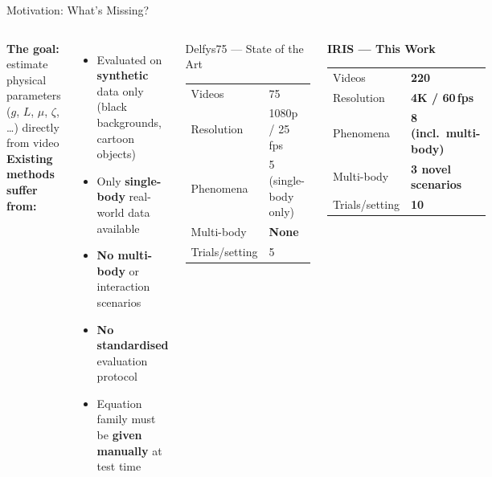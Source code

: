 \documentclass[aspectratio=169,12pt]{beamer}
\newcommand{\highlight}[1]{\textcolor{irisblue}{\textbf{#1}}}
\newcommand{\bad}[1]{\textcolor{irisred}{\textbf{#1}}}
\newcommand{\good}[1]{\textcolor{irisgreen}{\textbf{#1}}}
\begin{document}
\begin{frame}{Motivation: What's Missing?}
  \begin{columns}[T]
      \textbf{The goal:} estimate physical parameters\\
      ($g$, $L$, $\mu$, $\zeta$, \ldots) directly from video\\[0.8em]

      \textbf{Existing methods suffer from:}
      \begin{itemize}\setlength\itemsep{0.4em}
        \item Evaluated on \bad{synthetic} data only (black backgrounds, cartoon objects)
        \item Only \bad{single-body} real-world data available
        \item \bad{No multi-body} or interaction scenarios
        \item \bad{No standardised} evaluation protocol
        \item Equation family must be \bad{given manually} at test time
      \end{itemize}

      \begin{block}{Delfys75 — State of the Art}
        \begin{tabular}{ll}
          Videos & 75 \\
          Resolution & 1080p / 25\,fps \\
          Phenomena & 5 (single-body only) \\
          Multi-body & \bad{None} \\
          Trials/setting & 5 \\
        \end{tabular}
      \end{block}
      \vspace{0.4em}
      \begin{block}{\highlight{IRIS — This Work}}
        \begin{tabular}{ll}
          Videos & \good{220} \\
          Resolution & \good{4K / 60\,fps} \\
          Phenomena & \good{8 (incl.\ multi-body)} \\
          Multi-body & \good{3 novel scenarios} \\
          Trials/setting & \good{10} \\
        \end{tabular}
      \end{block}
  \end{columns}
\end{frame}
\end{document}
